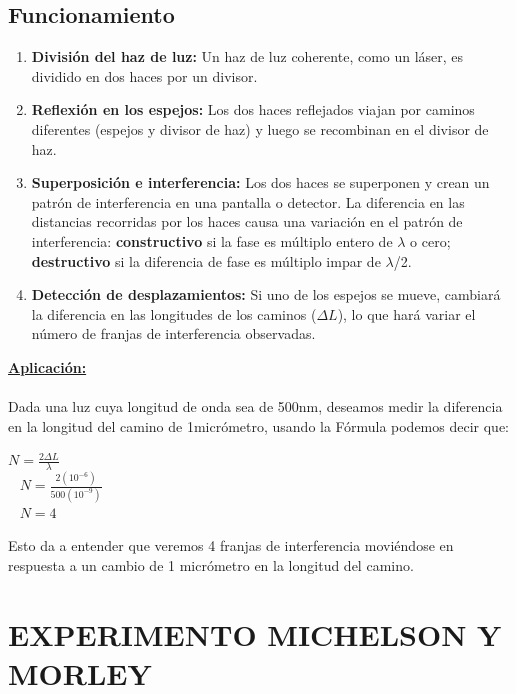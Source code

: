 \documentclass[a4paper]{article}
\begin{document}
		\subsection{Funcionamiento}
		\begin{enumerate}
			\item \textbf{División del haz de luz:} Un haz de luz coherente, como un láser, es dividido en dos haces por un divisor.
			
			\item \textbf{Reflexión en los espejos:} Los dos haces reflejados viajan por caminos diferentes (espejos y divisor de haz) y luego se recombinan en el divisor de haz.
			
			\item \textbf{Superposición e interferencia:} Los dos haces se superponen y crean un patrón de interferencia en una pantalla o detector. La diferencia en las distancias recorridas por los haces causa una variación en el patrón de interferencia: \textbf{constructivo} si la fase es múltiplo entero de $\lambda$ o cero; \textbf{destructivo} si la diferencia de fase es múltiplo impar de $\lambda$/2.
			
			\item \textbf{Detección de desplazamientos:} Si uno de los espejos se mueve, cambiará la diferencia en las longitudes de los caminos ($\Delta L$), lo que hará variar el número de franjas de interferencia observadas. 
		\end{enumerate}
		
		\textbf{\underline{Aplicación:}} \\ \\
		\indent Dada una luz cuya longitud de onda sea de 500nm, deseamos medir la diferencia en la longitud del camino de 1micrómetro, usando la Fórmula podemos decir que:
		\begin{center}
			$N = \frac{2 \Delta L}{\lambda}$  \\ \
			\newline
			$N = \frac{2(10^{-6})}{500(10^{-9})}$  \\ \
			\newline
			$N = 4$ \\
		\end{center}
		Esto da a entender que veremos 4 franjas de interferencia moviéndose en respuesta a un cambio de 1 micrómetro en la longitud del camino.
		
		\section{EXPERIMENTO MICHELSON Y MORLEY}
		
\end{document}
